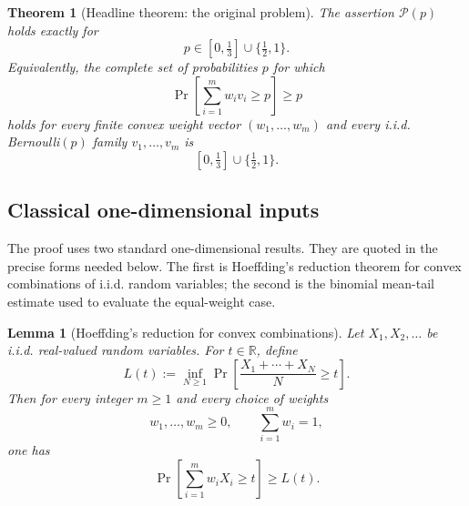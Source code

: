 \documentclass[12pt]{article}
\theoremstyle{definition}
\theoremstyle{plain}
\newtheorem{theorem}[definition]{Theorem}
\newtheorem{lemma}[definition]{Lemma}
\theoremstyle{remark}
\begin{document}
\begin{theorem}[Headline theorem: the original problem]\label{thm:main}
The assertion \(\mathcal P(p)\) holds exactly for
\[
p\in[0,\tfrac13]\cup\{\tfrac12,1\}.
\]
Equivalently, the complete set of probabilities \(p\) for which
\[
\Pr\!\left[\sum_{i=1}^{m} w_i v_i\ge p\right]\ge p
\]
holds for every finite convex weight vector \((w_1,\ldots,w_m)\) and every i.i.d. Bernoulli\((p)\) family \(v_1,\ldots,v_m\) is
\[
\boxed{[0,\tfrac13]\cup\{\tfrac12,1\}}.
\]
\end{theorem}

\subsection{Classical one-dimensional inputs}

The proof uses two standard one-dimensional results. They are quoted in the precise forms needed below. The first is Hoeffding's reduction theorem for convex combinations of i.i.d. random variables; the second is the binomial mean-tail estimate used to evaluate the equal-weight case.

\begin{lemma}[Hoeffding's reduction for convex combinations]\label{lem:hoeffding}
Let \(X_1,X_2,\ldots\) be i.i.d. real-valued random variables. For \(t\in\mathbb R\), define
\[
L(t):=\inf_{N\ge1}
\Pr\!\left[\frac{X_1+\cdots+X_N}{N}\ge t\right].
\]
Then for every integer \(m\ge1\) and every choice of weights
\[
w_1,\ldots,w_m\ge0,\qquad \sum_{i=1}^{m}w_i=1,
\]
one has
\[
\Pr\!\left[\sum_{i=1}^{m} w_iX_i\ge t\right]\ge L(t).
\]
\end{lemma}
\end{document}
